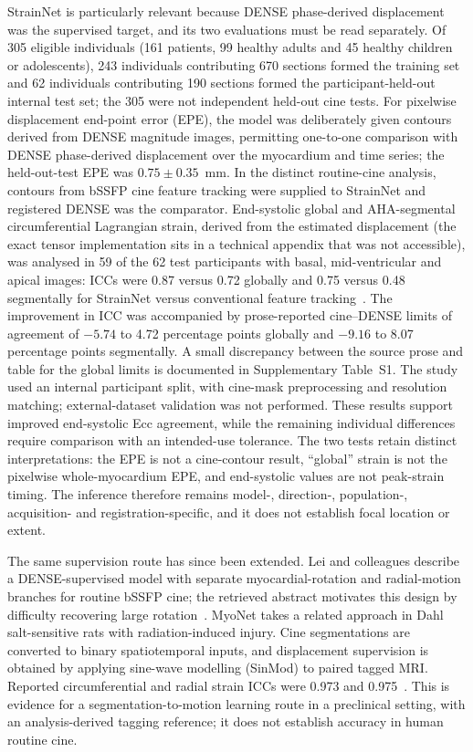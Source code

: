 StrainNet is particularly relevant because DENSE phase-derived displacement was the supervised target, and its two evaluations must be read separately. Of 305 eligible individuals (161 patients, 99 healthy adults and 45 healthy children or adolescents), 243 individuals contributing 670 sections formed the training set and 62 individuals contributing 190 sections formed the participant-held-out internal test set; the 305 were not independent held-out cine tests. For pixelwise displacement end-point error (EPE), the model was deliberately given contours derived from DENSE magnitude images, permitting one-to-one comparison with DENSE phase-derived displacement over the myocardium and time series; the held-out-test EPE was \(0.75\pm0.35\)~mm. In the distinct routine-cine analysis, contours from bSSFP cine feature tracking were supplied to StrainNet and registered DENSE was the comparator. End-systolic global and AHA-segmental circumferential Lagrangian strain, derived from the estimated displacement (the exact tensor implementation sits in a technical appendix that was not accessible), was analysed in 59 of the 62 test participants with basal, mid-ventricular and apical images: ICCs were 0.87 versus 0.72 globally and 0.75 versus 0.48 segmentally for StrainNet versus conventional feature tracking~\cite{wang2023strainnet}. The improvement in ICC was accompanied by prose-reported cine--DENSE limits of agreement of \(-5.74\) to 4.72 percentage points globally and \(-9.16\) to 8.07 percentage points segmentally. A small discrepancy between the source prose and table for the global limits is documented in Supplementary Table~S1. The study used an internal participant split, with cine-mask preprocessing and resolution matching; external-dataset validation was not performed. These results support improved end-systolic Ecc agreement, while the remaining individual differences require comparison with an intended-use tolerance. The two tests retain distinct interpretations: the EPE is not a cine-contour result, ``global'' strain is not the pixelwise whole-myocardium EPE, and end-systolic values are not peak-strain timing. The inference therefore remains model-, direction-, population-, acquisition- and registration-specific, and it does not establish focal location or extent.

The same supervision route has since been extended. Lei and colleagues describe a DENSE-supervised model with separate myocardial-rotation and radial-motion branches for routine bSSFP cine; the retrieved abstract motivates this design by difficulty recovering large rotation~\cite{lei2025denserotation}. MyoNet takes a related approach in Dahl salt-sensitive rats with radiation-induced injury. Cine segmentations are converted to binary spatiotemporal inputs, and displacement supervision is obtained by applying sine-wave modelling (SinMod) to paired tagged MRI. Reported circumferential and radial strain ICCs were 0.973 and 0.975~\cite{an2026myonet}. This is evidence for a segmentation-to-motion learning route in a preclinical setting, with an analysis-derived tagging reference; it does not establish accuracy in human routine cine.

